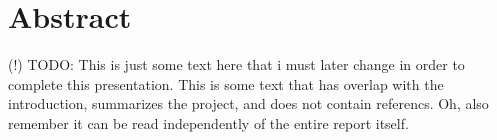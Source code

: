 
{\centering \section*{Abstract}} \label{sec:Abstract}

\vspace{-10pt}

{\small {\color{Red} (!) TODO: This is just some text here that i must later change in order to complete this presentation. This is some text that has overlap with the introduction, summarizes the project, and does not contain referencs. Oh, also remember it can be read independently of the entire report itself. }}

